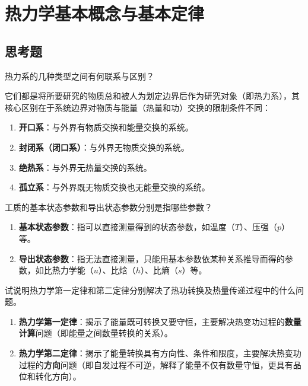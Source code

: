 \chapter{热力学基本概念与基本定律}

\section{思考题}

\begin{problem}
热力系的几种类型之间有何联系与区别？
\end{problem}

\begin{solution}
它们都是将所要研究的物质总和被人为划定边界后作为研究对象（即热力系），其核心区别在于系统边界对物质与能量（热量和功）交换的限制条件不同：

\begin{enumerate}
  \item \textbf{开口系}：与外界有物质交换和能量交换的系统。
  \item \textbf{封闭系（闭口系）}：与外界无物质交换的系统。
  \item \textbf{绝热系}：与外界无热量交换的系统。
  \item \textbf{孤立系}：与外界既无物质交换也无能量交换的系统。
\end{enumerate}
\end{solution}

\begin{problem}
工质的基本状态参数和导出状态参数分别是指哪些参数？
\end{problem}

\begin{solution}
\begin{enumerate}
  \item \textbf{基本状态参数}：指可以直接测量得到的状态参数，如温度（\(T\)）、压强（\(p\)）等。
  \item \textbf{导出状态参数}：指无法直接测量，只能用基本参数依某种关系推导而得的参数，如比热力学能（\(u\)）、比焓（\(h\)）、比熵（\(s\)）等。
\end{enumerate}
\end{solution}

\begin{problem}
试说明热力学第一定律和第二定律分别解决了热功转换及热量传递过程中的什么问题。
\end{problem}

\begin{solution}
\begin{enumerate}
  \item \textbf{热力学第一定律}：揭示了能量既可转换又要守恒，主要解决热变功过程的\textbf{数量计算}问题（即能量之间数量转换的关系）。
  \item \textbf{热力学第二定律}：揭示了能量转换具有方向性、条件和限度，主要解决热变功过程的\textbf{方向}问题（即自发过程不可逆，解释了能量不仅有数量守恒，更具有品位和转化方向）。
\end{enumerate}
\end{solution}


